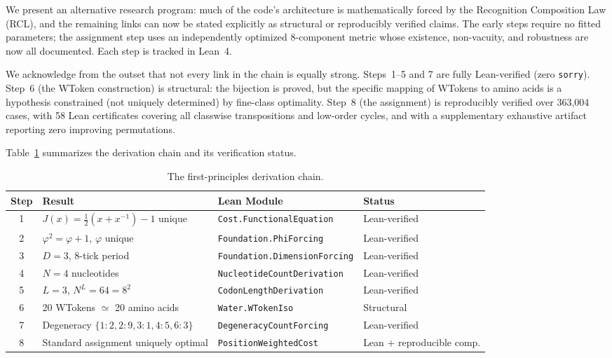 \documentclass[11pt,twocolumn]{article}
\newcommand{\vp}{\varphi}
\newcommand{\lean}[1]{\texttt{#1}}
\begin{document}
We present an alternative research program: much of the code's architecture
is mathematically forced by the Recognition Composition Law (RCL), and the
remaining links can now be stated explicitly as structural or reproducibly
verified claims. The early steps require no fitted parameters; the
assignment step uses an independently optimized 8-component metric whose
existence, non-vacuity, and robustness are now all documented. Each step is
tracked in Lean~4.

We acknowledge from the outset that not every link in the chain is
equally strong. Steps~1--5 and 7 are fully Lean-verified (zero
\texttt{sorry}). Step~6 (the WToken construction) is structural: the
bijection is proved, but the specific mapping of WTokens to amino acids
is a hypothesis constrained (not uniquely determined) by fine-class
optimality. Step~8 (the assignment) is reproducibly verified over
363,004 cases, with 58 Lean certificates covering all classwise
transpositions and low-order cycles, and with a supplementary exhaustive
artifact reporting zero improving permutations.

Table~\ref{tab:chain} summarizes the derivation chain and its
verification status.

\begin{table}[t]
\centering
\caption{The first-principles derivation chain.}\label{tab:chain}
\begin{tabular}{clll}
\toprule
\textbf{Step} & \textbf{Result} & \textbf{Lean Module} & \textbf{Status} \\
\midrule
1 & $J(x) = \frac{1}{2}(x + x^{-1}) - 1$ unique & \lean{Cost.FunctionalEquation} & Lean-verified \\
2 & $\vp^2 = \vp + 1$, $\vp$ unique & \lean{Foundation.PhiForcing} & Lean-verified \\
3 & $D = 3$, 8-tick period & \lean{Foundation.DimensionForcing} & Lean-verified \\
4 & $N = 4$ nucleotides & \lean{NucleotideCountDerivation} & Lean-verified \\
5 & $L = 3$, $N^L = 64 = 8^2$ & \lean{CodonLengthDerivation} & Lean-verified \\
6 & 20 WTokens $\simeq$ 20 amino acids & \lean{Water.WTokenIso} & Structural \\
7 & Degeneracy $\{1{:}2, 2{:}9, 3{:}1, 4{:}5, 6{:}3\}$ & \lean{DegeneracyCountForcing} & Lean-verified \\
8 & Standard assignment uniquely optimal & \lean{PositionWeightedCost} & Lean + reproducible comp. \\
\bottomrule
\end{tabular}
\end{table}
\end{document}
